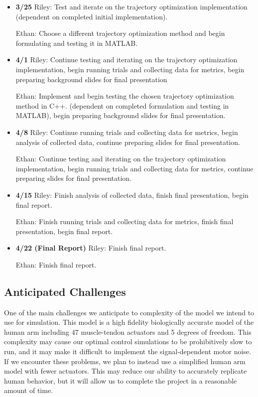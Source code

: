 \documentclass[table,12pt]{article}
\begin{document}
\begin{itemize}
    \item \textbf{3/25} Riley: Test and iterate on the trajectory optimization implementation (dependent on completed initial implementation).

    Ethan: Choose a different trajectory optimization method and begin formulating and testing it in MATLAB.

    \item \textbf{4/1} Riley: Continue testing and iterating on the trajectory optimization implementation, begin running trials and collecting data for metrics, begin preparing background slides for final presentation

    Ethan: Implement and begin testing the chosen trajectory optimization method in C++. (dependent on completed formulation and testing in MATLAB), begin preparing background slides for final presentation.

    \item \textbf{4/8} Riley: Continue running trials and collecting data for metrics, begin analysis of collected data, continue preparing slides for final presentation.

    Ethan: Continue testing and iterating on the trajectory optimization implementation, begin running trials and collecting data for metrics, continue preparing slides for final presentation.

    \item \textbf{4/15} Riley: Finish analysis of collected data, finish final presentation, begin final report.

    Ethan: Finish running trials and collecting data for metrics, finish final presentation, begin final report.

    \item \textbf{4/22 (Final Report)} Riley: Finish final report.

    Ethan: Finish final report.

\end{itemize}
\subsection{Anticipated Challenges}
One of the main challenges we anticipate to complexity of the model we intend to use for simulation. This model is a high fidelity biologically accurate model of the human arm including 47 muscle-tendon actuators and 5 degrees of freedom. This complexity may cause our optimal control simulations to be prohibitively slow to run, and it may make it difficult to implement the signal-dependent motor noise. If we encounter these problems, we plan to instead use a simplified human arm model with fewer actuators. This may reduce our ability to accurately replicate human behavior, but it will allow us to complete the project in a reasonable amount of time.
\end{document}
